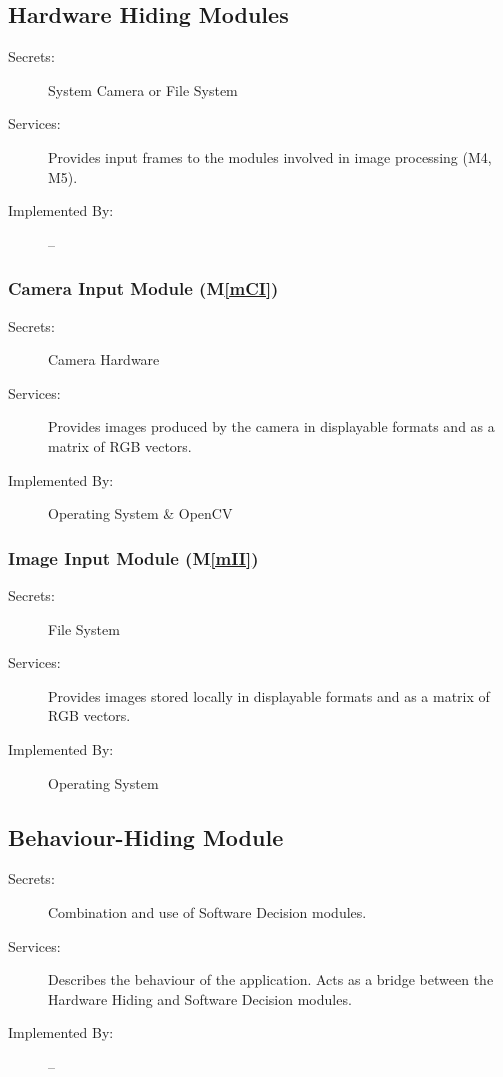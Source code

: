 \documentclass[12pt, titlepage]{article}
\newcommand{\mref}[1]{M\ref{#1}}
\begin{document}
\subsection{Hardware Hiding Modules}

\begin{description}
\item[Secrets:] System Camera or File System
\item[Services:] Provides input frames to the modules involved in image processing (M4, M5).
\item[Implemented By:] --
\end{description}

\subsubsection{Camera Input Module (\mref{mCI})}
\begin{description}
\item[Secrets:] Camera Hardware
\item[Services:] Provides images produced by the camera in displayable formats and as a matrix of RGB vectors.
\item[Implemented By:] Operating System \& OpenCV
\end{description}

\subsubsection{Image Input Module (\mref{mII})}
\begin{description}
\item[Secrets:] File System
\item[Services:] Provides images stored locally in displayable formats and as a matrix of RGB vectors.
\item[Implemented By:] Operating System
\end{description}

\subsection{Behaviour-Hiding Module}

\begin{description}
\item[Secrets:]  Combination and use of Software Decision modules.
\item[Services:] Describes the behaviour of the application. Acts as a bridge between the Hardware Hiding and Software Decision modules.
\item[Implemented By:] --
\end{description}
\end{document}
